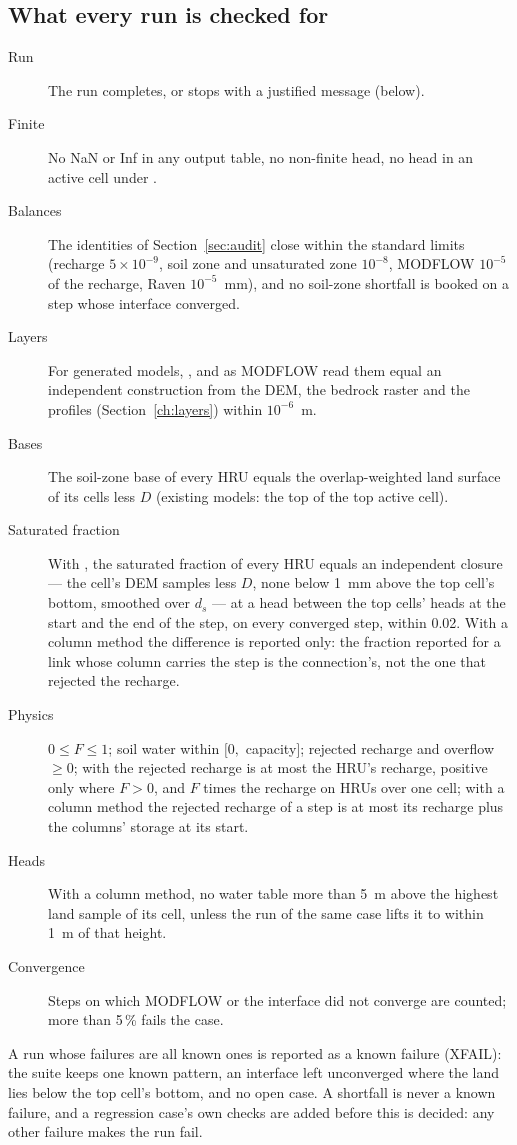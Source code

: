\subsection{What every run is checked for}
\begin{description}
\item[Run] The run completes, or stops with a justified message (below).
\item[Finite] No NaN or Inf in any output table, no non-finite head, no  head in an active cell under .
\item[Balances] The identities of Section~\ref{sec:audit} close within the standard limits (recharge $5\times10^{-9}$,
soil zone and unsaturated zone $10^{-8}$, MODFLOW $10^{-5}$ of the recharge, Raven $10^{-5}$~mm), and no soil-zone
shortfall is booked on a step whose interface converged.
\item[Layers] For generated models, ,  and  as MODFLOW read them equal an independent
construction from the DEM, the bedrock raster and the profiles (Section~\ref{ch:layers}) within $10^{-6}$~m.
\item[Bases] The soil-zone base of every HRU equals the overlap-weighted land surface of its cells less $D$ (existing
models: the top of the top active cell).
\item[Saturated fraction] With , the saturated fraction of every HRU equals an independent
closure --- the cell's DEM samples less $D$, none below 1~mm above the top cell's bottom, smoothed over $d_s$ --- at a head
between the top cells' heads at the start and the end of the step, on every converged step, within 0.02. With a column
method the difference is reported only: the fraction reported for a link whose column carries the step is the
connection's, not the one that rejected the recharge.
\item[Physics] $0\le F\le1$; soil water within $[0,$ capacity$]$; rejected recharge and overflow $\ge0$; with
 the rejected recharge is at most the HRU's recharge, positive only where $F>0$, and $F$ times the recharge on
HRUs over one cell; with a column method the rejected recharge of a step is at most its recharge plus the columns'
storage at its start.
\item[Heads] With a column method, no water table more than 5~m above the highest land sample of its cell, unless the
 run of the same case lifts it to within 1~m of that height.
\item[Convergence] Steps on which MODFLOW or the interface did not converge are counted; more than 5\,\% fails the case.
\end{description}
A run whose failures are all known ones is reported as a known failure (XFAIL): the suite keeps one known pattern, an
interface left unconverged where the land lies below the top cell's bottom, and no open case. A shortfall is never a known
failure, and a regression case's own checks are added before this is decided: any other failure makes the run fail.

